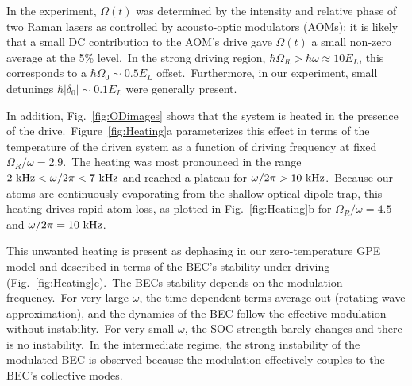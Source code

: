 \documentclass[twocolumn,amsmath,amssymb,floatfix,prl]{revtex4-1}
\begin{document}
In the experiment, $\Omega(t)$ was determined by the intensity and relative phase of two Raman lasers as controlled by acousto-optic modulators (AOMs); it is likely that a small DC contribution to the AOM's drive gave $\Omega(t)$ a small non-zero average at the 5\% level.~In the strong driving region, $\hbar \Omega _{R}>\hbar\omega \approx10E_{L}$, this corresponds to a $\hbar \Omega _{0}\sim 0.5E_{L}$ offset.~Furthermore, in our experiment, small detunings $\hbar |\delta_0|\sim0.1E_{L}$ were generally present.


In addition, Fig.~\ref{fig:ODimages} shows that the system is heated in the presence of the drive.~Figure~\ref{fig:Heating}a parameterizes this effect in terms of the temperature of the driven system as a function of driving frequency at fixed $\Omega_R/\omega = 2.9$.~The heating was most pronounced in the range $2~{\rm kHz}<\omega/2\pi<7~{\rm kHz}$ and reached a plateau for $\omega/2\pi>10~{\rm kHz}$.~Because our atoms are continuously evaporating from the shallow optical dipole trap, this heating drives rapid atom loss, as plotted in Fig.~\ref{fig:Heating}b for $\Omega_R/\omega = 4.5$ and $\omega/2\pi=10~{\rm kHz}$.

This unwanted heating is present as dephasing in our zero-temperature GPE model and described in terms of the BEC's stability under driving (Fig.~\ref{fig:Heating}c).~The BECs stability depends on the modulation frequency.~For very large $\omega $, the time-dependent terms average out (rotating wave approximation), and the dynamics of the BEC follow the effective modulation without instability.~For very small $\omega $, the SOC strength barely changes and there is no instability.~In the intermediate regime, the strong instability of the modulated BEC is observed because the modulation effectively couples to the BEC's collective modes.
\end{document}
